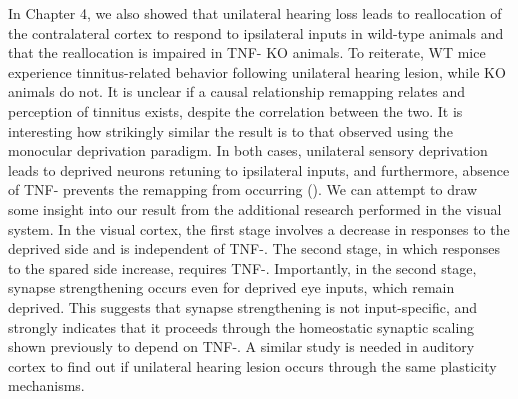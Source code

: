 In Chapter 4, we also showed that unilateral hearing loss leads to reallocation of the contralateral cortex to respond to ipsilateral inputs in wild-type animals and that the reallocation is impaired in TNF-\textalpha{} KO animals. To reiterate, WT mice experience tinnitus-related behavior following unilateral hearing lesion, while KO animals do not. It is unclear if a causal relationship remapping relates and perception of tinnitus exists, despite the correlation between the two. It is interesting how strikingly similar the result is to that observed using the monocular deprivation paradigm. In both cases, unilateral sensory deprivation leads to deprived neurons retuning to ipsilateral inputs, and furthermore, absence of TNF-\textalpha{} prevents the remapping from occurring (\cite{Mrsic-Flogel2007, Kaneko2008}). We can attempt to draw some insight into our result from the additional research performed in the visual system. In the visual cortex, the first stage involves a decrease in responses to the deprived side and is independent of TNF-\textalpha{}. The second stage, in which responses to the spared side increase, requires TNF-\textalpha{}. Importantly, in the second stage, synapse strengthening occurs even for deprived eye inputs, which remain deprived. This suggests that synapse strengthening is not input-specific, and strongly indicates that it proceeds through the homeostatic synaptic scaling shown previously to depend on TNF-\textalpha{}. A similar study is needed in auditory cortex to find out if unilateral hearing lesion occurs through the same plasticity mechanisms.

